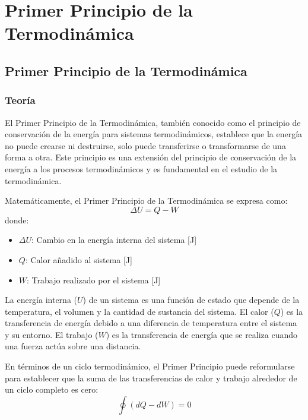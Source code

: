 \documentclass[../main]{subfiles}
\begin{document}
\chapter{Primer Principio de la Termodinámica}

\section{Primer Principio de la Termodinámica}

\subsection{Teoría}

El Primer Principio de la Termodinámica, también conocido como el principio de conservación de la energía para sistemas termodinámicos, establece que la energía no puede crearse ni destruirse, solo puede transferirse o transformarse de una forma a otra. Este principio es una extensión del principio de conservación de la energía a los procesos termodinámicos y es fundamental en el estudio de la termodinámica.

Matemáticamente, el Primer Principio de la Termodinámica se expresa como:
\begin{equation}
\Delta U = Q - W
\end{equation}
donde:
\begin{itemize}
    \item $\Delta U$: Cambio en la energía interna del sistema [J]
    \item $Q$: Calor añadido al sistema [J]
    \item $W$: Trabajo realizado por el sistema [J]
\end{itemize}

La energía interna ($U$) de un sistema es una función de estado que depende de la temperatura, el volumen y la cantidad de sustancia del sistema. El calor ($Q$) es la transferencia de energía debido a una diferencia de temperatura entre el sistema y su entorno. El trabajo ($W$) es la transferencia de energía que se realiza cuando una fuerza actúa sobre una distancia.

En términos de un ciclo termodinámico, el Primer Principio puede reformularse para establecer que la suma de las transferencias de calor y trabajo alrededor de un ciclo completo es cero:
\begin{equation}
\oint (dQ - dW) = 0
\end{equation}
\end{document}
